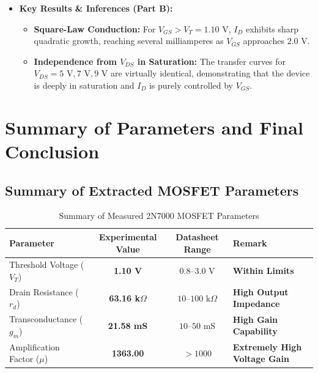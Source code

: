 \documentclass[11pt,a4paper]{article}
\begin{document}
\begin{itemize}
    \item \textbf{Key Results \& Inferences (Part B):}
    \begin{itemize}
        \item \textbf{Square-Law Conduction:} For $V_{GS} > V_T = 1.10\text{ V}$, $I_D$ exhibits sharp quadratic growth, reaching several milliamperes as $V_{GS}$ approaches $2.0\text{ V}$.
        \item \textbf{Independence from $V_{DS}$ in Saturation:} The transfer curves for $V_{DS} = 5\text{ V}, 7\text{ V}, 9\text{ V}$ are virtually identical, demonstrating that the device is deeply in saturation and $I_D$ is purely controlled by $V_{GS}$.
    \end{itemize}
\end{itemize}

\clearpage

\section{Summary of Parameters and Final Conclusion}

\subsection{Summary of Extracted MOSFET Parameters}
\begin{table}[H]
\centering
\caption{Summary of Measured 2N7000 MOSFET Parameters}
\begin{tabular}{p{5.0cm} c c p{4.0cm}}
\toprule
\textbf{Parameter} & \textbf{Experimental Value} & \textbf{Datasheet Range} & \textbf{Remark} \\
\midrule
Threshold Voltage ($V_T$) & \textbf{1.10 V} & $0.8\text{--}3.0\text{ V}$ & \textbf{Within Limits} \\
Drain Resistance ($r_d$) & \textbf{63.16 k$\Omega$} & $10\text{--}100\text{ k}\Omega$ & \textbf{High Output Impedance} \\
Transconductance ($g_m$) & \textbf{21.58 mS} & $10\text{--}50\text{ mS}$ & \textbf{High Gain Capability} \\
Amplification Factor ($\mu$) & \textbf{1363.00} & $>1000$ & \textbf{Extremely High Voltage Gain} \\
\bottomrule
\end{tabular}
\end{table}
\end{document}
